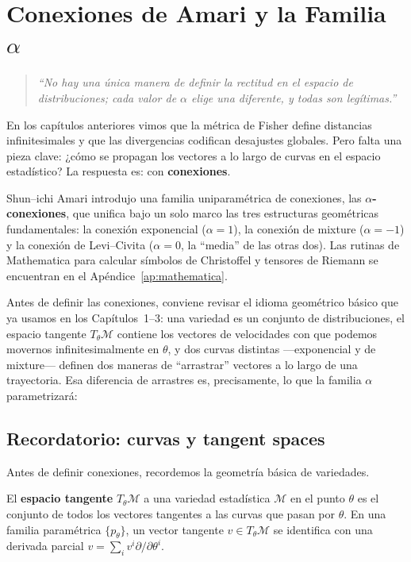 
\chapter[Conexiones de Amari y la Familia alpha]{Conexiones de Amari y la Familia $\alpha$}

\begin{quotation}
	\itshape
	``No hay una única manera de definir la rectitud en el espacio de distribuciones; cada valor de $\alpha$ elige una diferente, y todas son legítimas.''
\end{quotation}

En los capítulos anteriores vimos que la métrica de Fisher define distancias infinitesimales y que las divergencias codifican desajustes globales.  Pero falta una pieza clave: ¿cómo se propagan los vectores a lo largo de curvas en el espacio estadístico?  La respuesta es: con \textbf{conexiones}.

Shun--ichi Amari introdujo una familia uniparamétrica de conexiones, las \textbf{$\alpha$-conexiones}, que unifica bajo un solo marco las tres estructuras geométricas fundamentales: la conexión exponencial ($\alpha = 1$), la conexión de mixture ($\alpha = -1$) y la conexión de Levi--Civita ($\alpha = 0$, la ``media'' de las otras dos).  Las rutinas de Mathematica para calcular símbolos de Christoffel y tensores de Riemann se encuentran en el Apéndice~\ref{ap:mathematica}.

\bigskip
\noindent
Antes de definir las conexiones, conviene revisar el idioma geométrico básico que ya usamos en los Capítulos~1--3: una variedad es un conjunto de distribuciones, el espacio tangente $T_\theta \mathcal{M}$ contiene los vectores de velocidades con que podemos movernos infinitesimalmente en $\theta$, y dos curvas distintas ---exponencial y de mixture--- definen dos maneras de ``arrastrar'' vectores a lo largo de una trayectoria. Esa diferencia de arrastres es, precisamente, lo que la familia $\alpha$ parametrizará:

\section{Recordatorio: curvas y tangent spaces}

Antes de definir conexiones, recordemos la geometría básica de variedades.

\begin{definition}
	El \textbf{espacio tangente} $T_\theta \mathcal{M}$ a una variedad estadística $\mathcal{M}$ en el punto $\theta$ es el conjunto de todos los vectores tangentes a las curvas que pasan por $\theta$.  En una familia paramétrica $\{p_\theta\}$, un vector tangente $v \in T_\theta \mathcal{M}$ se identifica con una derivada parcial $v = \sum_i v^i \partial/\partial\theta^i$.
\end{definition}

